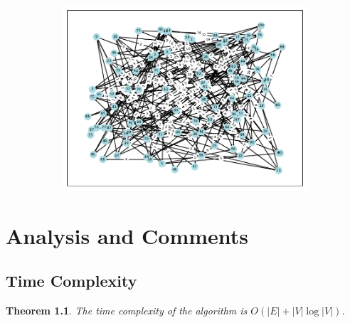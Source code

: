 \documentclass[a4paper,oneside]{book}
\newtheorem{theorem}{Theorem}[section]
\begin{document}
\begin{figure}[!ht]
\begin{subfigure}[b]{0.3\textwidth}
        \includegraphics[width=\textwidth]{src/mid.pdf}
    \end{subfigure}
    \label{fig:test_graphs}
\end{figure}

\chapter{Analysis and Comments}

\section{Time Complexity}

\begin{theorem}
The time complexity of the algorithm is $O(|E| + |V| \log |V|)$.
\end{theorem}
\end{document}
